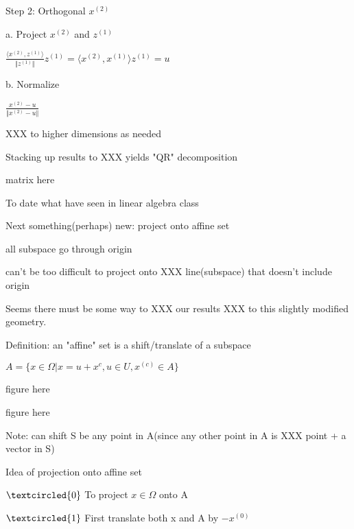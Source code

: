 Step 2: Orthogonal $x^{(2)}$

a.  Project $x^{(2)}$ and $z^{(1)}$

$\frac{\langle x^{(2)},z^{(1)}\rangle}{\Vert z^{(1)}\Vert} z^{(1)}=\langle x^{(2)},x^{(1)}\rangle z^{(1)}=u$


b. Normalize 

$\frac{x^{(2)}-u}{\Vert x^{(2)}-u\Vert}$

\begin{marginfigure}
	\centering
	\resizebox{7.5cm}{3cm}{}
	\caption{}
	\label{}
\end{marginfigure}

XXX to higher dimensions as needed


Stacking up results to XXX yields "QR" decomposition

matrix here

To date what have seen in linear algebra class

Next something(perhaps) new: project onto affine set

\begin{marginfigure}
	\centering
	\resizebox{7.5cm}{3cm}{}
	\caption{}
	\label{}
\end{marginfigure}

all subspace go through origin

can't be too difficult to project onto XXX line(subspace) that doesn't include origin

\begin{marginfigure}
	\centering
	\resizebox{7.5cm}{3cm}{}
	\caption{}
	\label{}
\end{marginfigure}

Seems there must be some way to XXX our results XXX to this slightly modified geometry.

\vspace{0.5cm}
Definition: an "affine" set is a shift/translate of a subspace

$A=\{x\in\Omega|x=u+x^{c}, u\in U, x^{(c)}\in A\}$

figure here

figure here

Note: can shift S be any point in A(since any other point in A is XXX point + a vector in S)

Idea of projection onto affine set

$\textcircled{0}$ To project $x\in \Omega$ onto A

$\textcircled{1}$ First translate both x and A by $-x^{(0)}$

